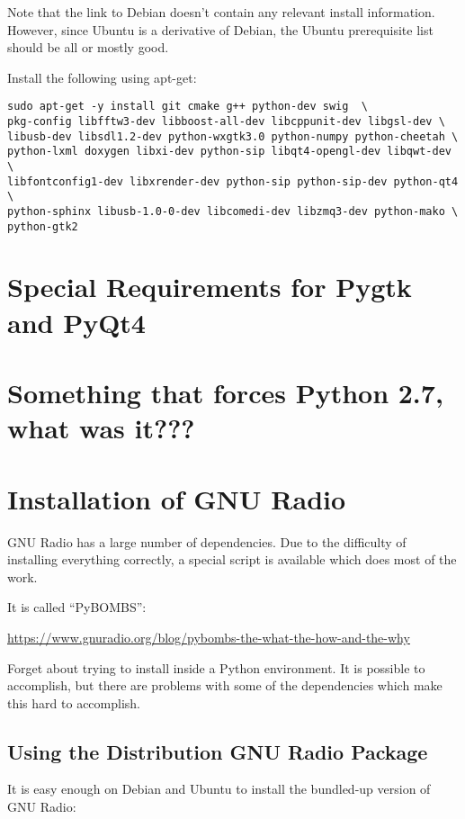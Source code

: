 Note that the link to Debian doesn't contain any relevant install information.
However, since Ubuntu is a derivative of Debian, the Ubuntu prerequisite list
should be all or mostly good.

Install the following using apt-get:

\begin{verbatim}
sudo apt-get -y install git cmake g++ python-dev swig  \
pkg-config libfftw3-dev libboost-all-dev libcppunit-dev libgsl-dev \
libusb-dev libsdl1.2-dev python-wxgtk3.0 python-numpy python-cheetah \
python-lxml doxygen libxi-dev python-sip libqt4-opengl-dev libqwt-dev \
libfontconfig1-dev libxrender-dev python-sip python-sip-dev python-qt4 \
python-sphinx libusb-1.0-0-dev libcomedi-dev libzmq3-dev python-mako \
python-gtk2
\end{verbatim}


\section{Special Requirements for Pygtk and PyQt4}



\section{Something that forces Python 2.7, what was it???}

\section{Installation of GNU Radio}

GNU Radio has a large number of dependencies.  Due to the difficulty of installing everything correctly, a special script is available which does most of the work.

It is called ``PyBOMBS'':

\url{https://www.gnuradio.org/blog/pybombs-the-what-the-how-and-the-why}

Forget about trying to install inside a Python environment.  It is possible to
accomplish, but there are problems with some of the dependencies which make
this hard to accomplish.

\subsection{Using the Distribution GNU Radio Package}

It is easy enough on Debian and Ubuntu to install the bundled-up version of GNU Radio:

